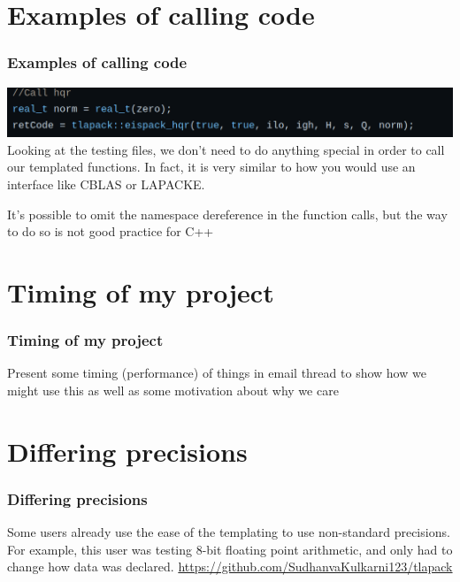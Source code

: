 \documentclass[12pt]{beamer}
\begin{document}
    \section{Examples of calling code}
    \begin{frame}
        \frametitle{Examples of calling code}
        \includegraphics[width=\textwidth]{images/callingHqr.png}
        Looking at the testing files, we don't need to do anything special in order to call our templated
        functions. In fact, it is very similar to how you would use an interface like CBLAS or LAPACKE.

        It's possible to omit the namespace dereference in the function calls, but the way to do so is 
        not good practice for C++
    \end{frame}
    \section{Timing of my project}
    \begin{frame}
        \frametitle{Timing of my project}
        Present some timing (performance) of things in email thread to show how we might use this as well as 
        some motivation about why we care


    \end{frame}
    \section{Differing precisions}
    \begin{frame}
        \frametitle{Differing precisions}
        Some users already use the ease of the templating to use non-standard precisions. For example, this
        user was testing 8-bit floating point arithmetic, and only had to change how data was declared.
        \url{https://github.com/SudhanvaKulkarni123/tlapack}
    \end{frame}
\end{document}
